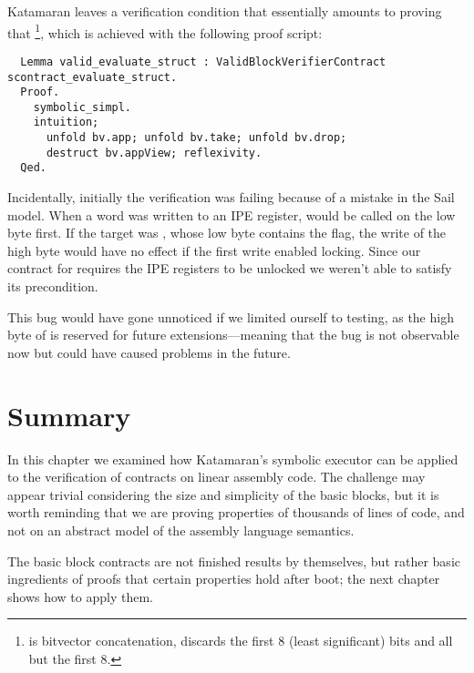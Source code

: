 Katamaran leaves a verification condition that essentially amounts to proving that \footnote{ is bitvector concatenation,  discards the first 8 (least significant) bits and  all but the first 8.}, which is achieved with the following proof script:

\begin{verbatim}
  Lemma valid_evaluate_struct : ValidBlockVerifierContract scontract_evaluate_struct.
  Proof.
    symbolic_simpl.
    intuition;
      unfold bv.app; unfold bv.take; unfold bv.drop;
      destruct bv.appView; reflexivity.
  Qed.
\end{verbatim}

Incidentally, initially the verification was failing because of a mistake in the Sail model. When a word was written to an IPE register,  would be called on the low byte first. If the target was , whose low byte contains the  flag, the write of the high byte would have no effect if the first write enabled locking. Since our contract for  requires the IPE registers to be unlocked we weren't able to satisfy its precondition.

This bug would have gone unnoticed if we limited ourself to testing, as the high byte of  is reserved for future extensions---meaning that the bug is not observable now but could have caused problems in the future.

\section{Summary}

In this chapter we examined how Katamaran's symbolic executor can be applied to the verification of contracts on linear assembly code. The challenge may appear trivial considering the size and simplicity of the basic blocks, but it is worth reminding that we are proving properties of thousands of lines of \usail code, and not on an abstract model of the assembly language semantics.

The basic block contracts are not finished results by themselves, but rather basic ingredients of proofs that certain properties hold after boot; the next chapter shows how to apply them.
